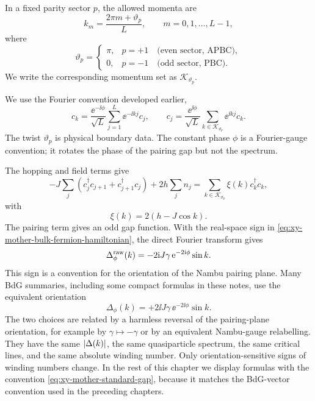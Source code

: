 In a fixed parity sector $p$, the allowed momenta are
\begin{equation}
\label{eq:xy-mother-allowed-momenta}
    k_m=\frac{2\pi m+\vartheta_p}{L},
    \qquad
    m=0,1,\ldots,L-1,
\end{equation}
where
\begin{equation}
\label{eq:xy-mother-boundary-twist-sector}
    \vartheta_p=
    \begin{cases}
        \pi, & p=+1 \quad \text{(even sector, APBC)},\\
        0, & p=-1 \quad \text{(odd sector, PBC)}.
    \end{cases}
\end{equation}
We write the corresponding momentum set as $\mathcal{K}_{\vartheta_p}$.

We use the Fourier convention developed earlier,
\begin{equation}
\label{eq:xy-mother-fourier-convention}
    c_k
    =
    \frac{\ee^{-\ii\phi}}{\sqrt{L}}
    \sum_{j=1}^{L}\ee^{-\ii kj}c_j,
    \qquad
    c_j
    =
    \frac{\ee^{\ii\phi}}{\sqrt{L}}
    \sum_{k\in\mathcal{K}_{\vartheta_p}}\ee^{\ii kj}c_k .
\end{equation}
The twist $\vartheta_p$ is physical boundary data.  The constant phase $\phi$ is a
Fourier-gauge convention; it rotates the phase of the pairing gap but not the
spectrum.

The hopping and field terms give
\begin{equation}
\label{eq:xy-mother-normal-dispersion}
    -J\sum_j
    \left(
        c_j^\dagger c_{j+1}+c_{j+1}^\dagger c_j
    \right)
    +2h\sum_j n_j
    =
    \sum_{k\in\mathcal{K}_{\vartheta_p}}
    \xi(k)c_k^\dagger c_k,
\end{equation}
with
\begin{equation}
\label{eq:xy-mother-xi-k}
    \xi(k)=2(h-J\cos k).
\end{equation}
The pairing term gives an odd gap function.  With the real-space sign in
\cref{eq:xy-mother-bulk-fermion-hamiltonian}, the direct Fourier transform gives
\begin{equation}
\label{eq:xy-mother-raw-gap}
    \Delta_\phi^{\rm raw}(k)
    =
    -2\mathrm{i} J\gamma\,\mathrm{e}^{-2\mathrm{i}\phi}\sin k.
\end{equation}
This sign is a convention for the orientation of the Nambu pairing plane.  Many
BdG summaries, including some compact formulas in these notes, use the equivalent
orientation
\begin{equation}
\label{eq:xy-mother-standard-gap}
    \Delta_\phi(k)
    =
    +2\ii J\gamma\,\ee^{-2\ii\phi}\sin k.
\end{equation}
The two choices are related by a harmless reversal of the pairing-plane
orientation, for example by $\gamma\mapsto-\gamma$ or by an equivalent Nambu-gauge
relabelling.  They have the same $\left|\Delta(k)\right|$, the same quasiparticle
spectrum, the same critical lines, and the same absolute winding number.  Only
orientation-sensitive signs of winding numbers change.  In the rest of this
chapter we display formulas with the convention
\cref{eq:xy-mother-standard-gap}, because it matches the BdG-vector convention
used in the preceding chapters.

